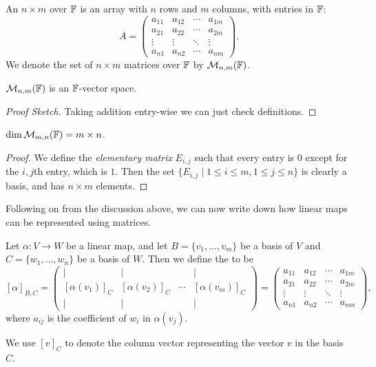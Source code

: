 \documentclass[a4paper]{scrartcl}
\begin{document}
\begin{definition}[Matrix]
    An $n \times m$  over $\mathbb{F}$ is an array with $n$ rows and $m$ columns, with entries in $\mathbb{F}$:
    $$
    A = \begin{pmatrix}
        a_{11} & a_{12} & \cdots & a_{1m} \\
        a_{21} & a_{22} & \cdots & a_{2m} \\
        \vdots&\vdots&\ddots &\vdots\\
        a_{n1} & a_{n2} & \cdots & a_{nm}
    \end{pmatrix}.
    $$
    We denote the set of $n \times m$ matrices over $\mathbb{F}$ by $\mathcal{M}_{n,m}(\mathbb{F})$.
\end{definition}

\begin{proposition}
    $\mathcal{M}_{n, m}(\mathbb{F})$ is an $\mathbb{F}$-vector space.
\end{proposition}
\begin{proof}[Proof Sketch]
    Taking addition entry-wise we can just check definitions.
\end{proof}

\begin{proposition}
    $\dim \mathcal{M}_{m, n}(\mathbb{F}) = m \times n$.
\end{proposition}
\begin{proof}
    We define the \emph{elementary matrix} $E_{i, j}$ such that every entry is $0$ except for the $i, j$th entry, which is $1$.
    Then the set $\{E_{i, j} \mid 1 \leq i \leq m, 1 \leq j \leq n\}$ is clearly a basis, and has $n \times m$ elements.
\end{proof}

Following on from the discussion above, we can now write down how linear maps can be represented using matrices.

\begin{definition}
    Let $\alpha: V \rightarrow W$ be a linear map, and let $B = \{v_1, \dots, v_m\}$ be a basis of $V$ and $C = \{w_1, \dots, w_n\}$ be a basis of $W$. Then we define the  to be
    $$
    [\alpha]_{B, C} = \begin{pmatrix}
        | & | & & | \\
        [\alpha(v_1)]_C & [\alpha(v_2)]_C & \cdots & [\alpha(v_m)]_C \\
        | & | & & |
    \end{pmatrix} = \begin{pmatrix}
        a_{11} & a_{12} & \cdots & a_{1m} \\
        a_{21} & a_{22} & \cdots & a_{2m} \\
        \vdots&\vdots&\ddots &\vdots\\
        a_{n1} & a_{n2} & \cdots & a_{nm}
    \end{pmatrix},
    $$
    where $a_{ij}$ is the coefficient of $w_i$ in $\alpha(v_j)$.
\end{definition}
\begin{remark}[Notation]
    We use $[v]_C$ to denote the column vector representing the vector $v$ in the basis $C$.
\end{remark}
\end{document}
